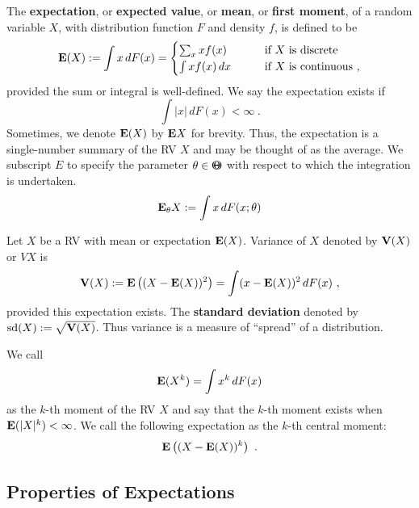 \begin{definition}[Expectation of a RV]
The {\bf expectation}, or {\bf expected value}, or {\bf mean}, or {\bf first moment}, of a random variable $X$, with distribution function $F$ and density $f$, is defined to be
\begin{equation}\label{E:Mean}
\mathbf{E}(X) := \int x\,dF(x) = 
\begin{cases}
\sum_x x f(x) & \qquad \text{if $X$ is discrete} \\
\int x f(x)\,dx  & \qquad \text{if $X$ is continuous} \  ,
\end{cases}
\end{equation}
provided the sum or integral is well-defined.  We say the expectation exists if
\begin{equation}\label{E:ExpectationExists}
\int \left|x\right|\,dF(x) < \infty \ .
\end{equation}
Sometimes, we denote $\mathbf{E}(X)$ by $\mathbf{E} X$ for brevity.  Thus, the expectation is a single-number summary of the RV $X$ and may be thought of  as the average.
We subscript $E$ to specify the parameter $\theta \in {\Theta}\mspace{-11 mu}{\Theta}$ with respect to which the integration is undertaken. 
\[
\mathbf{E}_{\theta} X := \int x\,dF(x;\theta)
\]
\end{definition}

\begin{definition}[Variance of a RV]\label{D:VarianceofX}
Let $X$ be a RV with mean or expectation $\mathbf{E}(X)$.  Variance of $X$ denoted by $\mathbf{V}(X)$ or $VX$ is
\[
\mathbf{V}(X) := \mathbf{E} \left((X-\mathbf{E}(X))^2\right) = \int (x-\mathbf{E}(X))^2 \,d F(x) \ ,
\]
provided this expectation exists.  The {\bf standard deviation} denoted by ${\rm sd}(X) := \sqrt{\mathbf{V}(X)}$.
Thus variance is a measure of ``spread'' of a distribution.
\end{definition}

\begin{definition}[$k$-th moment of a RV]
We call 
\[
\mathbf{E}(X^k) = \int x^k\,dF(x)
\]
as the $k$-th moment of the RV $X$ and say that the $k$-th moment exists when $\mathbf{E}(|X|^k) < \infty$.  We call the following expectation as the $k$-th central moment:
\[
\mathbf{E} \left((X- \mathbf{E}(X))^k\right) \ .
\]
\end{definition}

\subsection*{Properties of Expectations}

